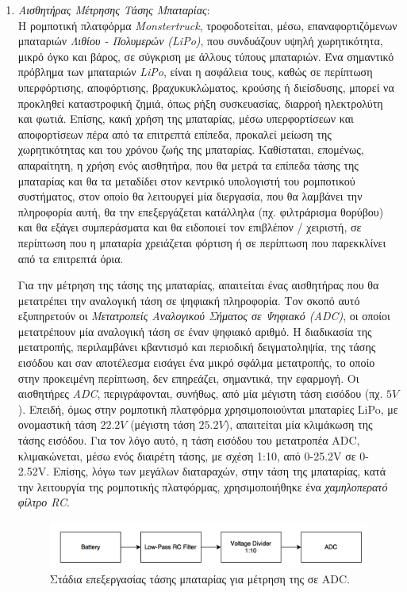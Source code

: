 \begin{enumerate}
\bigskip
\item \textit{Αισθητήρας Μέτρησης Τάσης Μπαταρίας}:\\
Η ρομποτική πλατφόρμα \textit{Monstertruck}, τροφοδοτείται, μέσω, επαναφορτιζόμενων μπαταριών \textit{Λιθίου - Πολυμερών (LiPo)}, που συνδυάζουν υψηλή χωρητικότητα, μικρό όγκο και βάρος, σε σύγκριση με άλλους τύπους μπαταριών. Ένα σημαντικό πρόβλημα των μπαταριών \textit{LiPo}, είναι η ασφάλεια τους, καθώς σε περίπτωση υπερφόρτισης, αποφόρτισης, βραχυκυκλώματος, κρούσης ή διείσδυσης, μπορεί να προκληθεί καταστροφική ζημιά, όπως ρήξη συσκευασίας, διαρροή ηλεκτρολύτη και φωτιά. Επίσης, κακή χρήση της μπαταρίας, μέσω υπερφορτίσεων και αποφορτίσεων πέρα από τα επιτρεπτά επίπεδα, προκαλεί μείωση της χωρητικότητας και του χρόνου ζωής της μπαταρίας. Καθίσταται, επομένως, απαραίτητη, η χρήση ενός αισθητήρα, που θα μετρά τα επίπεδα τάσης της μπαταρίας και θα τα μεταδίδει στον κεντρικό υπολογιστή του ρομποτικού συστήματος, στον οποίο θα λειτουργεί μία διεργασία, που θα λαμβάνει την πληροφορία αυτή, θα την επεξεργάζεται κατάλληλα (πχ. φιλτράρισμα θορύβου) και θα εξάγει συμπεράσματα και θα ειδοποιεί τον επιβλέπον / χειριστή, σε περίπτωση που η μπαταρία χρειάζεται φόρτιση ή σε περίπτωση που παρεκκλίνει από τα επιτρεπτά όρια.

Για την μέτρηση της τάσης της μπαταρίας, απαιτείται ένας αισθητήρας που θα μετατρέπει την αναλογική τάση σε ψηφιακή πληροφορία. Τον σκοπό αυτό εξυπηρετούν οι \textit{Μετατροπείς Αναλογικού Σήματος σε Ψηφιακό (ADC)}, οι οποίοι μετατρέπουν μία αναλογική τάση σε έναν ψηφιακό αριθμό. Η διαδικασία της μετατροπής, περιλαμβάνει κβαντισμό και περιοδική δειγματοληψία, της τάσης εισόδου και σαν αποτέλεσμα εισάγει ένα μικρό σφάλμα μετατροπής, το οποίο στην προκειμένη περίπτωση, δεν επηρεάζει, σημαντικά, την εφαρμογή. Οι αισθητήρες \textit{ADC}, περιγράφονται, συνήθως, από μία μέγιστη τάση εισόδου (πχ. $5V$). Επειδή, όμως στην ρομποτική πλατφόρμα χρησιμοποιούνται μπαταρίες LiPo, με ονομαστική τάση $22.2V$ (μέγιστη τάση $25.2V$), απαιτείται μία κλιμάκωση της τάσης εισόδου. Για τον λόγο αυτό, η τάση εισόδου του μετατροπέα ADC, κλιμακώνεται, μέσω ενός διαιρέτη τάσης, με σχέση 1:10, από 0-25.2V σε 0-2.52V. Επίσης, λόγω των μεγάλων διαταραχών, στην τάση της μπαταρίας, κατά την λειτουργία της ρομποτικής πλατφόρμας, χρησιμοποιήθηκε ένα \textit{χαμηλοπερατό φίλτρο RC}. 

\begin{figure}[!ht]
	\centering
	\includegraphics[width=\linewidth]{Chapters/Chapter2/Figures/rc_filter_divider.png}
	\caption{Στάδια επεξεργασίας τάσης μπαταρίας για μέτρηση της σε ADC.}
	\label{fig:rc_filter_divider}
\end{figure}

\end{enumerate}


